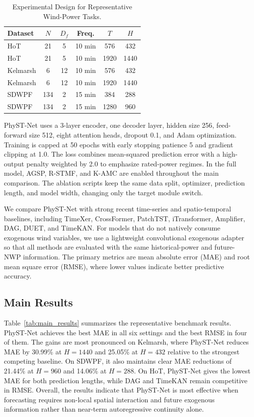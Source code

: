 \begin{table}[!t]
\caption{Experimental Design for Representative Wind-Power Tasks.}
\label{tab:exp_design}
\centering
\scriptsize

\renewcommand{\arraystretch}{1.12}
\setlength{\tabcolsep}{3.2pt}
\begin{tabular}{lccccc}
\toprule
\textbf{Dataset} & \textbf{$N$} & \textbf{$D_f$} & \textbf{Freq.} & \textbf{$T$} & \textbf{$H$} \\
\midrule
HoT & 21 & 5 & 10 min & 576 & 432 \\
HoT & 21 & 5 & 10 min & 1920 & 1440 \\
Kelmarsh & 6 & 12 & 10 min & 576 & 432 \\
Kelmarsh & 6 & 12 & 10 min & 1920 & 1440 \\
SDWPF & 134 & 2 & 15 min & 384 & 288 \\
SDWPF & 134 & 2 & 15 min & 1280 & 960 \\
\bottomrule
\end{tabular}
\end{table}

PhyST-Net uses a 3-layer encoder, one decoder layer, hidden size 256, feed-forward size 512, eight attention heads, dropout 0.1, and Adam optimization. Training is capped at 50 epochs with early stopping patience 5 and gradient clipping at 1.0. The loss combines mean-squared prediction error with a high-output penalty weighted by 2.0 to emphasize rated-power regimes. In the full model, AGSP, R-STMF, and K-AMC are enabled throughout the main comparison. The ablation scripts keep the same data split, optimizer, prediction length, and model width, changing only the target module switch.

We compare PhyST-Net with strong recent time-series and spatio-temporal baselines, including TimeXer, CrossFormer, PatchTST, iTransformer, Amplifier, DAG, DUET, and TimeKAN. For models that do not natively consume exogenous wind variables, we use a lightweight convolutional exogenous adapter so that all methods are evaluated with the same historical-power and future-NWP information. The primary metrics are mean absolute error (MAE) and root mean square error (RMSE), where lower values indicate better predictive accuracy.

\subsection{Main Results}
\label{sec:main_results}

Table~\ref{tab:main_results} summarizes the representative benchmark results. PhyST-Net achieves the best MAE in all six settings and the best RMSE in four of them. The gains are most pronounced on Kelmarsh, where PhyST-Net reduces MAE by 30.99\% at $H=1440$ and 25.05\% at $H=432$ relative to the strongest competing baseline. On SDWPF, it also maintains clear MAE reductions of 21.44\% at $H=960$ and 14.06\% at $H=288$. On HoT, PhyST-Net gives the lowest MAE for both prediction lengths, while DAG and TimeKAN remain competitive in RMSE. Overall, the results indicate that PhyST-Net is most effective when forecasting requires non-local spatial interaction and future exogenous information rather than near-term autoregressive continuity alone.

